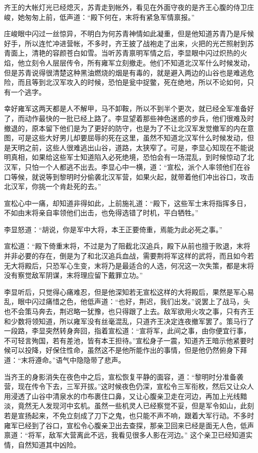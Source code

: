 齐王的大帐灯光已经熄灭，苏青走到帐外，看见在外面守夜的是齐王心腹的侍卫庄峻，她匆匆上前，低声道：“殿下何在，末将有紧急军情禀报。”

庄峻眼中闪过一丝惊异，不明白为何苏青神情如此凝重，但是他知道苏青乃是斥候好手，所以连忙冲进营帐，不多时，齐王披了战袍走了出来，火把的光芒照射到苏青面上，清艳的容颜苍白如雪。当听苏青禀明军情之后，李显眼中闪过炽热的火焰，他立刻令人层层传令，所有雍军立刻撤走。他们不知道北汉军什么时候发动，但是苏青说得很清楚这种黑油燃烧的烟是有毒的，就是避入两边的山谷也是难逃危险，而且等到北汉军攻入的时候，恐怕是瓮中捉鳖，死在绝地，所以不论如何，只有一个逃字。

幸好雍军这两天都是人不解甲，马不卸鞍，所以不到半个更次，就已经全军准备好了，而动作最快的一批已经上路了。李显望着那些神色迷惑的步兵，他们很难及时撤退的，原本留下他们是为了更好的防守，也是为了不让北汉军发觉撤军的内在意图，可是这些大好男儿却要屈辱的死在这里，虽然不知道北汉军什么时候发动，但是天明之前，这些人很难逃出山谷，道路，太狭窄了。可是，李显心知现在不能说明真相，如果给这些军士知道陷入必死绝境，恐怕会有一场混乱，到时候惊动了北汉军，只怕一个人都逃不出去。李显心中一横，道：“宣松，派个人率领他们在谷口等候，就说等到黎明时分偷袭北汉军营，如果火起，就带着他们冲出谷口，攻击北汉军，你挑一个肯赴死的去。”

宣松心中一痛，却知道非得如此，上前施礼道：“殿下，这些军士末将指挥多日，不如由末将亲自率领他们出击，也免得选错了时机，平白牺牲。”

李显怒道：“胡说，你是军中大将，本王正要倚重，焉能为此必死之事。”

宣松道：“殿下倚重末将，不过是为了阻截北汉追兵，殿下从前也擅于败退，末将并非必要的存在，倒是为了和北汉追兵血战，需要荆将军这样的武将，而且如今若无大将殿后，只恐军心生变，末将乃是最适合的人选，何况这一次失策，都是末将没有察觉敌军阴谋，末将理应留下戴罪立功。”

李显听后，只觉得心痛难忍，但是他深知若无宣松这样的大将殿后，果然是军心易乱，眼中闪过痛惜之色，他低声道：“也好，荆迟，我们出发。”说罢上了战马，头也不会策马奔去，荆迟略一犹豫，也只得跟了上去。敌军欲用火攻之事，只有齐王和少数将领知道，所以雍军没有丝毫混乱，只道齐王决定连夜撤军罢了。策马行了一段路，李显突然转身奔回，指着宣松道：“宣将军，此间之事，由你便宜行事，不可轻言殉国，若有差池，皆有本王担待。”宣松身子一震，知道齐王暗示他紧要时候可以投降，好保住性命，虽然这不是他所能作出的事情，但是他仍然俯身下拜道：“末将遵命。”语气中隐隐带了悲声。

当齐王的身影消失在夜色中之后，宣松恢复平静的面容，道：“黎明时分准备袭营，现在传令下去，三军开拔。”这时候夜色仍深，宣松令三军衔枚，然后又让众人用浸透了山谷中清泉水的巾布裹住口鼻，又让心腹亲卫走在河边，再加上光线黯淡，竟然无人发现河中玄机。虽然一些机灵人已经察觉不妥，但是军令如山，此刻若是宣扬起来，不免立刻成了刀下之鬼，也只能不声不响，跟着大军行动。不多时雍军已经到了谷口，宣松令心腹亲卫出去查探，那亲卫回来已经是面无人色，低声禀道：“将军，敌军大营离此不远，我看见很多人影在河边。” 这个亲卫已经知道实情，自然知道其中凶险。

